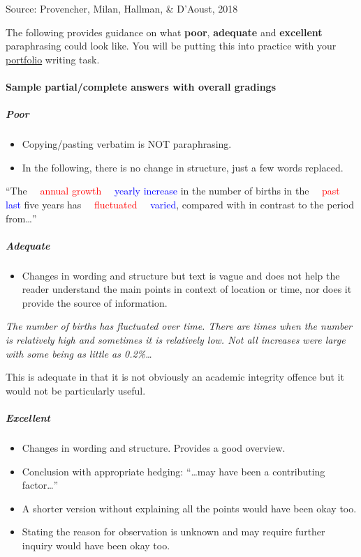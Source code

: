 \documentclass[
  openany]{book}
\providecommand{\tightlist}{%
  \setlength{\itemsep}{0pt}\setlength{\parskip}{0pt}}
\begin{document}
Source: Provencher, Milan, Hallman, \& D'Aoust, 2018

The following provides guidance on what \textbf{poor}, \textbf{adequate} and \textbf{excellent} paraphrasing could look like. You will be putting this into practice with your \protect\hyperlink{portfolio}{portfolio} writing task.

\hypertarget{sample-partialcomplete-answers-with-overall-gradings}{%
\paragraph{Sample partial/complete answers with overall gradings}\label{sample-partialcomplete-answers-with-overall-gradings}}

\hypertarget{poor}{%
\subparagraph{Poor}\label{poor}}

\begin{itemize}
\item
  Copying/pasting verbatim is NOT paraphrasing.
\item
  In the following, there is no change in structure, just a few words replaced.
\end{itemize}

``The \textcolor{red}{~~annual growth~~} \textcolor{blue}{yearly increase} in the number of births in the \textcolor{red}{~~past~~} \textcolor{blue}{last} five years has \textcolor{red}{~~fluctuated~~} \textcolor{blue}{varied}, compared with in contrast to the period from\ldots{}''

\hypertarget{adequate}{%
\subparagraph{Adequate}\label{adequate}}

\begin{itemize}
\tightlist
\item
  Changes in wording and structure but text is vague and does not help the reader understand the main points in context of location or time, nor does it provide the source of information.
\end{itemize}

\emph{The number of births has fluctuated over time. There are times when the number is relatively high and sometimes it is relatively low. Not all increases were large with some being as little as 0.2\%\ldots{}}

This is adequate in that it is not obviously an academic integrity offence but it would not be particularly useful.

\hypertarget{excellent}{%
\subparagraph{Excellent}\label{excellent}}

\begin{itemize}
\tightlist
\item
  Changes in wording and structure. Provides a good overview.
\item
  Conclusion with appropriate hedging: ``\ldots may have been a contributing factor\ldots{}''
\item
  A shorter version without explaining all the points would have been okay too.
\item
  Stating the reason for observation is unknown and may require further inquiry would have been okay too.
\end{itemize}
\end{document}

